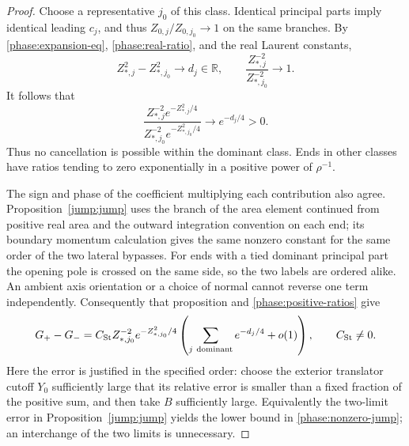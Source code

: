 \begin{proof}
Choose a representative $j_0$ of this class.  Identical principal parts
imply identical leading $c_j$, and thus
$Z_{0,j}/Z_{0,j_0}\to1$ on the same branches.
By \eqref{phase:expansion-eq}, \eqref{phase:real-ratio}, and the real
Laurent constants,
\[
 Z_{*,j}^2-Z_{*,j_0}^2\longrightarrow d_j\in\mathbb R,
       \qquad \frac{Z_{*,j}^{-2}}{Z_{*,j_0}^{-2}}\longrightarrow1.
\]
It follows that
\begin{equation}
 \frac{Z_{*,j}^{-2}e^{-Z_{*,j}^2/4}}
      {Z_{*,j_0}^{-2}e^{-Z_{*,j_0}^2/4}}
       \longrightarrow e^{-d_j/4}>0.
 \label{phase:positive-ratios}
\end{equation}
Thus no cancellation is possible within the dominant class.  Ends in
other classes have ratios tending to zero exponentially in a positive
power of $\rho^{-1}$.

The sign and phase of the coefficient multiplying each contribution
also agree.  Proposition~\ref{jump:jump} uses the branch of the area
element continued from positive real area and the outward integration
convention on each end; its boundary momentum calculation gives the same
nonzero constant for the same order of the two lateral bypasses.
For ends with a tied dominant principal part the opening pole is crossed
on the same side, so the two labels are ordered alike.  An ambient axis
orientation or a choice of normal cannot reverse one term independently.
Consequently that proposition and \eqref{phase:positive-ratios} give
\begin{equation}
 G_+-G_-=C_{\rm St}
    Z_{*,j_0}^{-2}e^{-Z_{*,j_0}^2/4}
       \left(\sum_{j\ \mathrm{dominant}}e^{-d_j/4}+o(1)\right),
 \qquad C_{\rm St}\ne0.
 \label{phase:nonzero-jump}
\end{equation}
Here the error is justified in the specified order: choose the exterior
translator cutoff $Y_0$ sufficiently large that its relative error is
smaller than a fixed fraction of the positive sum, and then take $B$
sufficiently large.  Equivalently the two-limit error in
Proposition~\ref{jump:jump} yields the lower bound in
\eqref{phase:nonzero-jump}; an interchange of the two limits is unnecessary.


\end{proof}

